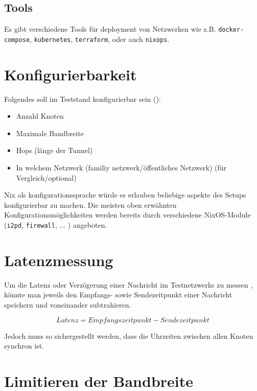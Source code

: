 \subsection{Tools}


Es gibt verschiedene Tools für deployment von Netzwerken wie z.B. \lstinline|docker-compose|, \lstinline|kubernetes|, \lstinline|terraform|, oder auch \lstinline|nixops|.


\section{Konfigurierbarkeit}

Folgendes soll im Teststand konfigurierbar sein ():

\begin{itemize}
    \item Anzahl Knoten
    \item Maximale Bandbreite
    \item Hops (länge der Tunnel)
    \item In welchem Netzwerk (familiy netzwerk/öffentliches Netzwerk) (für Vergleich/optional)
\end{itemize}

Nix als konfigurationssprache würde es erlauben beliebige aspekte des Setups konfigurierbar zu machen.
Die meisten oben erwähnten Konfigurationsmöglichkeiten werden bereits durch verschiedene NixOS-Module (\lstinline|i2pd|, \lstinline|firewall|, ... ) angeboten.

\section{Latenzmessung}

Um die Latenz oder Verzögerung einer Nachricht im Testnetzwerks zu messen , könnte man jeweils den Empfangs- sowie Sendezeitpunkt einer Nachricht speichern und voneinander subtrahieren.

\begin{equation}
    Latenz = Empfangszeitpunkt - Sendezeitpunkt
\end{equation}

Jedoch muss so sichergestellt werden, dass die Uhrzeiten zwischen allen Knoten synchron ist.


\section{Limitieren der Bandbreite}

